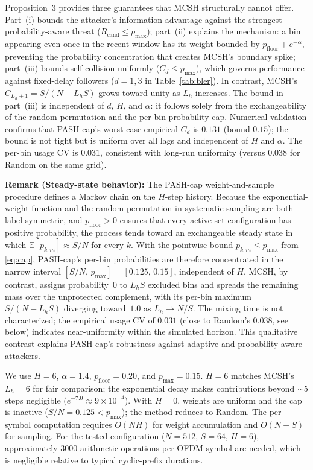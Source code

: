 \documentclass[letterpaper,journal,10pt]{IEEEtran}
\begin{document}
Proposition~3 provides three guarantees that MCSH structurally cannot offer.
Part~(i) bounds the attacker's information advantage against the strongest
probability-aware threat ($R_{\mathrm{cand}}\leq p_{\max}$); part~(ii)
explains the mechanism: a bin appearing even once in the recent window has its
weight bounded by $p_{\mathrm{floor}}+e^{-\alpha}$, preventing the
probability concentration that creates MCSH's boundary spike; part~(iii)
bounds self-collision uniformly ($C_d\leq p_{\max}$), which governs
performance against fixed-delay followers ($d{=}1,3$ in Table~\ref{tab:bler}).
In contrast, MCSH's $C_{L_h+1}=S/(N-L_hS)$ grows toward unity as $L_h$
increases. The bound in part~(iii) is independent of $d$, $H$, and $\alpha$:
it follows solely from the exchangeability of the random permutation and the
per-bin probability cap.
Numerical validation confirms that PASH-cap's worst-case empirical $C_d$ is
$0.131$ (bound $0.15$); the bound is not tight but is uniform over all lags
and independent of $H$ and $\alpha$. The per-bin usage
CV is $0.031$, consistent with long-run uniformity
(versus $0.038$ for Random on the same grid).

\textbf{Remark (Steady-state behavior):} The PASH-cap weight-and-sample
procedure defines a Markov chain on the $H$-step history. Because the
exponential-weight function and the random permutation in systematic
sampling are both label-symmetric, and $p_{\mathrm{floor}}>0$ ensures
that every active-set configuration has positive probability, the
process tends toward an exchangeable steady state in which
$\mathbb E[p_{k,m}]\approx S/N$ for every $k$. With the pointwise bound
$p_{k,m}\leq p_{\max}$ from \eqref{eq:cap}, PASH-cap's per-bin
probabilities are therefore concentrated in the narrow interval
$[S/N,\,p_{\max}]=[0.125,\,0.15]$, independent of $H$. MCSH, by
contrast, assigns probability~0 to $L_hS$ excluded bins and spreads
the remaining mass over the unprotected complement, with its per-bin
maximum $S/(N-L_hS)$ diverging toward~$1.0$ as $L_h\to N/S$. The mixing time is not characterized; the empirical usage CV of $0.031$
(close to Random's $0.038$, see below) indicates near-uniformity within
the simulated horizon. This qualitative contrast explains PASH-cap's
robustness against adaptive and probability-aware attackers.

We use $H=6$, $\alpha=1.4$, $p_{\mathrm{floor}}=0.20$, and $p_{\max}=0.15$.
$H{=}6$ matches MCSH's $L_h{=}6$ for fair comparison; the exponential decay
makes contributions beyond $\sim$5 steps negligible ($e^{-7.0}{\approx}9{\times}10^{-4}$).
With $H{=}0$, weights are uniform and the cap is inactive
($S/N{=}0.125<p_{\max}$); the method reduces to Random.
The per-symbol computation requires $O(NH)$ for weight accumulation and
$O(N+S)$ for sampling. For the tested configuration ($N{=}512$,
$S{=}64$, $H{=}6$), approximately 3000 arithmetic operations per OFDM symbol
are needed, which is negligible relative to typical cyclic-prefix durations.
\end{document}
